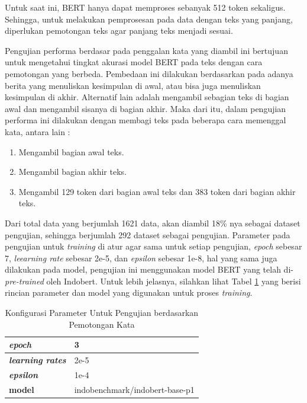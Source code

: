 Untuk saat ini, BERT hanya dapat memproses sebanyak 512 token sekaligus. Sehingga, untuk melakukan pemprosesan pada data dengan teks yang panjang, diperlukan pemotongan teks agar panjang teks menjadi sesuai.

Pengujian performa berdasar pada penggalan kata yang diambil ini bertujuan untuk mengetahui tingkat akurasi model BERT pada teks dengan cara pemotongan yang berbeda. Pembedaan ini dilakukan berdasarkan pada adanya berita yang menuliskan kesimpulan di awal, atau bisa juga menuliskan kesimpulan di akhir. Alternatif lain adalah mengambil sebagian teks di bagian awal dan mengambil sisanya di bagian akhir. Maka dari itu, dalam pengujian performa ini dilakukan dengan membagi teks pada beberapa cara memenggal kata, antara lain :

\begin{enumerate}[nolistsep]
    \item Mengambil bagian awal teks.
    \item Mengambil bagian akhir teks.
    \item Mengambil 129 token dari bagian awal teks dan 383 token dari bagian akhir teks.
\end{enumerate}

Dari total data yang berjumlah 1621 data, akan diambil 18\% nya sebagai dataset pengujian, sehingga berjumlah 292 dataset sebagai pengujian. Parameter pada pengujian untuk \textit{training} di atur agar sama untuk setiap pengujian, \textit{epoch} sebesar 7, \textit{leearning rate} sebesar 2e-5, dan \textit{epsilon} sebesar 1e-8, hal yang sama juga dilakukan pada model, pengujian ini menggunakan model BERT yang telah di-\textit{pre-trained} oleh Indobert. Untuk lebih jelasnya, silahkan lihat Tabel \ref{tab: truncate_param} yang berisi rincian parameter dan model yang digunakan untuk proses \textit{training}.

\begin{table}
    \caption{Konfigurasi Parameter Untuk Pengujian berdasarkan Pemotongan Kata}
    \label{tab: truncate_param}
    \centering
    \begin{tabular}{|l|l|}
        \hline
        \textit{\textbf{epoch}}          & 3                              \\ \hline
        \textit{\textbf{learning rates}} & 2e-5                           \\ \hline
        \textit{\textbf{epsilon}}        & 1e-4                           \\ \hline
        \textbf{model}                   & indobenchmark/indobert-base-p1 \\ \hline
    \end{tabular}
\end{table}

